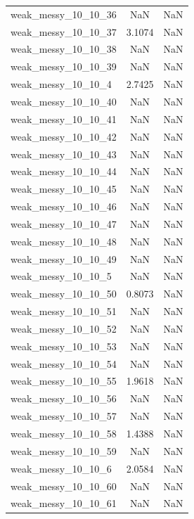 \begin{longtable}{lcc}
weak\_messy\_10\_10\_36    &      NaN &     NaN \\
weak\_messy\_10\_10\_37    &   3.1074 &     NaN \\
weak\_messy\_10\_10\_38    &      NaN &     NaN \\
weak\_messy\_10\_10\_39    &      NaN &     NaN \\
weak\_messy\_10\_10\_4     &   2.7425 &     NaN \\
weak\_messy\_10\_10\_40    &      NaN &     NaN \\
weak\_messy\_10\_10\_41    &      NaN &     NaN \\
weak\_messy\_10\_10\_42    &      NaN &     NaN \\
weak\_messy\_10\_10\_43    &      NaN &     NaN \\
weak\_messy\_10\_10\_44    &      NaN &     NaN \\
weak\_messy\_10\_10\_45    &      NaN &     NaN \\
weak\_messy\_10\_10\_46    &      NaN &     NaN \\
weak\_messy\_10\_10\_47    &      NaN &     NaN \\
weak\_messy\_10\_10\_48    &      NaN &     NaN \\
weak\_messy\_10\_10\_49    &      NaN &     NaN \\
weak\_messy\_10\_10\_5     &      NaN &     NaN \\
weak\_messy\_10\_10\_50    &   0.8073 &     NaN \\
weak\_messy\_10\_10\_51    &      NaN &     NaN \\
weak\_messy\_10\_10\_52    &      NaN &     NaN \\
weak\_messy\_10\_10\_53    &      NaN &     NaN \\
weak\_messy\_10\_10\_54    &      NaN &     NaN \\
weak\_messy\_10\_10\_55    &   1.9618 &     NaN \\
weak\_messy\_10\_10\_56    &      NaN &     NaN \\
weak\_messy\_10\_10\_57    &      NaN &     NaN \\
weak\_messy\_10\_10\_58    &   1.4388 &     NaN \\
weak\_messy\_10\_10\_59    &      NaN &     NaN \\
weak\_messy\_10\_10\_6     &   2.0584 &     NaN \\
weak\_messy\_10\_10\_60    &      NaN &     NaN \\
weak\_messy\_10\_10\_61    &      NaN &     NaN \\

\end{longtable}
